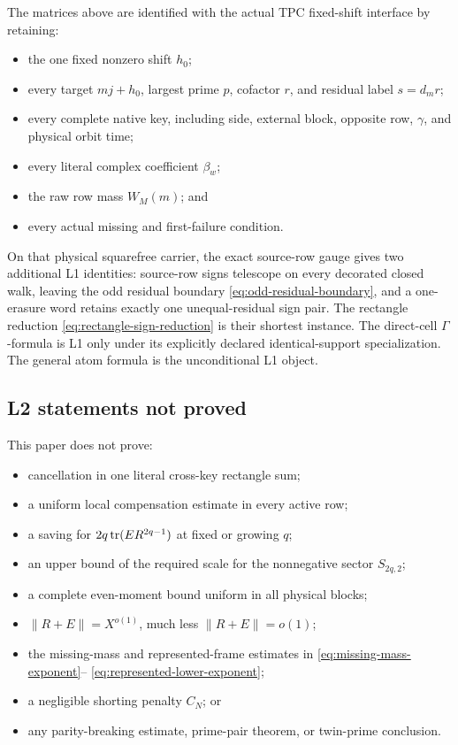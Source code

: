 The matrices above are identified with the actual TPC fixed-shift
interface by retaining:
\begin{itemize}
 \item the one fixed nonzero shift \(h_0\);
 \item every target \(mj+h_0\), largest prime \(p\), cofactor \(r\), and
       residual label \(s=d_mr\);
 \item every complete native key, including side, external block,
       opposite row, \(\gamma\), and physical orbit time;
 \item every literal complex coefficient \(\beta_w\);
 \item the raw row mass \(W_M(m)\); and
 \item every actual missing and first-failure condition.
\end{itemize}
On that physical squarefree carrier, the exact source-row gauge gives two
additional L1 identities: source-row signs telescope on every decorated
closed walk, leaving the odd residual boundary
\eqref{eq:odd-residual-boundary}, and a one-erasure word retains exactly
one unequal-residual sign pair.  The rectangle reduction
\eqref{eq:rectangle-sign-reduction} is their shortest instance.
The direct-cell \(\Gamma\)-formula is L1 only under its explicitly declared
identical-support specialization.  The general atom formula is the
unconditional L1 object.

\subsection{L2 statements not proved}

This paper does not prove:
\begin{itemize}
 \item cancellation in one literal cross-key rectangle sum;
 \item a uniform local compensation estimate in every active row;
 \item a saving for
       \(2q\operatorname{tr}(ER^{2q-1})\) at fixed or growing \(q\);
 \item an upper bound of the required scale for the nonnegative sector
       \(S_{2q,2}\);
 \item a complete even-moment bound uniform in all physical blocks;
 \item \(\|R+E\|=X^{o(1)}\), much less \(\|R+E\|=o(1)\);
 \item the missing-mass and represented-frame estimates in
       \eqref{eq:missing-mass-exponent}--%
       \eqref{eq:represented-lower-exponent};
 \item a negligible shorting penalty \(C_N\); or
 \item any parity-breaking estimate, prime-pair theorem, or twin-prime
       conclusion.
\end{itemize}

